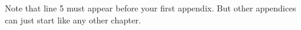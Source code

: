 \documentclass[oneside,12pt,a4paper,bibliography=totoc,numbers=noenddot,table]{scrreprt} %
\renewcommand{\chaptermark}[1]{\markboth{\ #1}{}}	%
\begin{document}
Note that line 5 must appear before your first appendix. But other appendices can just start like any other chapter.

\singlespacing



\printbibheading
\printbibliography[heading=none]


\end{document}
